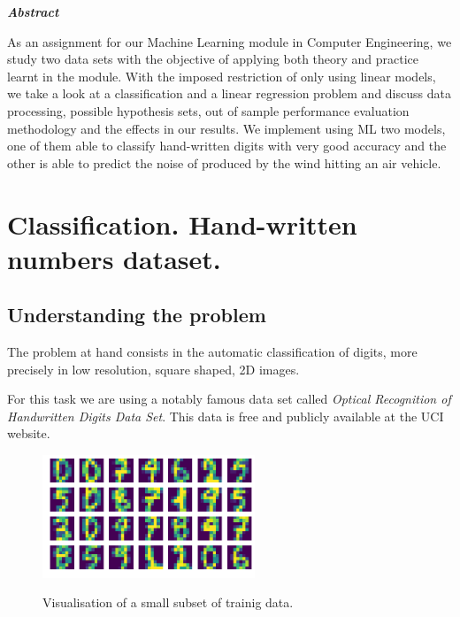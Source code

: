 \documentclass{article}
\begin{document}



\begin{center}
    \textit{\textbf{Abstract}}
\end{center}

As an assignment for our Machine Learning module in Computer Engineering, we study two data sets with the objective of applying both theory and practice learnt in the module. With the imposed restriction of only using linear models, we take a look at a classification and a linear regression problem and discuss data processing, possible hypothesis sets, out of sample performance evaluation methodology and the effects in our results. We implement using ML two models, one of them able to classify hand-written digits with very good accuracy and the other is able to predict the noise of produced by the wind hitting an air vehicle.

\section{Classification. Hand-written numbers dataset.}

\subsection{Understanding the problem}

The problem at hand consists in the automatic classification of digits, more precisely in low resolution, square shaped, 2D images. 


For this task we are using a notably famous data set called \textit{Optical Recognition of Handwritten Digits Data Set}. This data is free and publicly available at the UCI website. \cite{Dua:2019}


\begin{figure}[H]
\centering
\includegraphics[width=240px]{figures/fig01}
\label{fig:Dataset visualization}
\caption{\footnotesize Visualisation of a small subset of trainig data.}
\end{figure}
\end{document}

